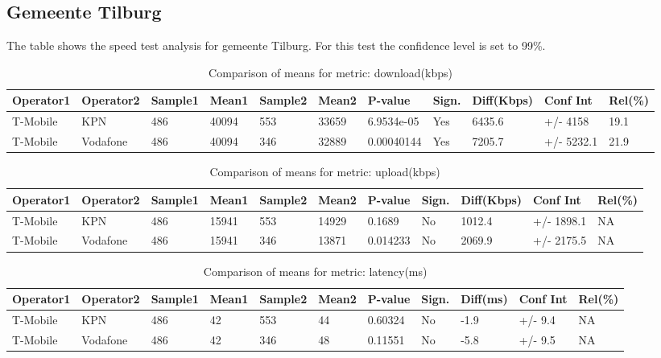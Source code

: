 \documentclass[]{article}
\begin{document}
\normalsize

\newpage

\subsection{Gemeente Tilburg}\label{gemeente-tilburg}

The table shows the speed test analysis for gemeente Tilburg. For this
test the confidence level is set to 99\%.

\begin{table}[ht]
\centering
{\footnotesize
\begin{tabular}{lllllllllll}
  \hline
Operator1 & Operator2 & Sample1 & Mean1 & Sample2 & Mean2 & P-value & Sign. & Diff(Kbps) & Conf Int & Rel(\%) \\ 
  \hline
T-Mobile & KPN & 486 & 40094 & 553 & 33659 & 6.9534e-05 & Yes & 6435.6 & +/- 4158 & 19.1 \\ 
  T-Mobile & Vodafone & 486 & 40094 & 346 & 32889 & 0.00040144 & Yes & 7205.7 & +/- 5232.1 & 21.9 \\ 
   \hline
\end{tabular}
}
\caption{Comparison of means for metric: download(kbps)} 
\end{table}\begin{table}[ht]
\centering
{\footnotesize
\begin{tabular}{lllllllllll}
  \hline
Operator1 & Operator2 & Sample1 & Mean1 & Sample2 & Mean2 & P-value & Sign. & Diff(Kbps) & Conf Int & Rel(\%) \\ 
  \hline
T-Mobile & KPN & 486 & 15941 & 553 & 14929 & 0.1689 & No & 1012.4 & +/- 1898.1 & NA \\ 
  T-Mobile & Vodafone & 486 & 15941 & 346 & 13871 & 0.014233 & No & 2069.9 & +/- 2175.5 & NA \\ 
   \hline
\end{tabular}
}
\caption{Comparison of means for metric: upload(kbps)} 
\end{table}\begin{table}[ht]
\centering
{\footnotesize
\begin{tabular}{lllllllllll}
  \hline
Operator1 & Operator2 & Sample1 & Mean1 & Sample2 & Mean2 & P-value & Sign. & Diff(ms) & Conf Int & Rel(\%) \\ 
  \hline
T-Mobile & KPN & 486 & 42 & 553 & 44 & 0.60324 & No & -1.9 & +/- 9.4 & NA \\ 
  T-Mobile & Vodafone & 486 & 42 & 346 & 48 & 0.11551 & No & -5.8 & +/- 9.5 & NA \\ 
   \hline
\end{tabular}
}
\caption{Comparison of means for metric: latency(ms)} 
\end{table}
\end{document}
